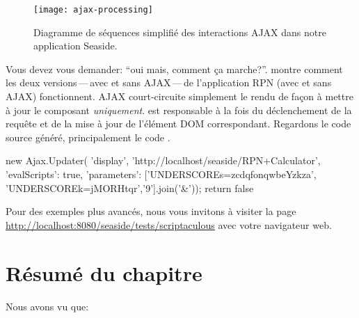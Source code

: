 \documentclass[a4paper,10pt,twoside]{book}
\begin{document}
\begin{figure}[ht]
\begin{center}
\texttt{[image: ajax-processing]}
\caption{Diagramme de séquences simplifié des interactions AJAX dans notre application Seaside.}
\end{center}
\end{figure}


Vous devez vous demander: ``oui mais, comment ça marche?''.
 montre comment les deux versions\,---\,avec et
sans AJAX\,---\,de l'application RPN (avec et sans AJAX) fonctionnent.
AJAX court-circuite simplement le rendu de façon à mettre à jour le
composant  \emph{uniquement}. 
\jscript est responsable à la fois du déclenchement de la requête et
de la mise à jour de l'élément DOM correspondant.
Regardons le code source généré, principalement le code \jscript.

\begin{code}{}
new Ajax.Updater(
	'display',
	'http://localhost/seaside/RPN+Calculator',
	{'evalScripts': true,
	  'parameters': ['UNDERSCOREs=zcdqfonqwbeYzkza', 'UNDERSCOREk=jMORHtqr','9'].join('&')});
return false
\end{code}

Pour des exemples plus avancés, nous vous invitons à visiter la page
\url{http://localhost:8080/seaside/tests/scriptaculous} avec votre
navigateur web.


\section{Résumé du chapitre}

Nous avons vu que:
\end{document}
